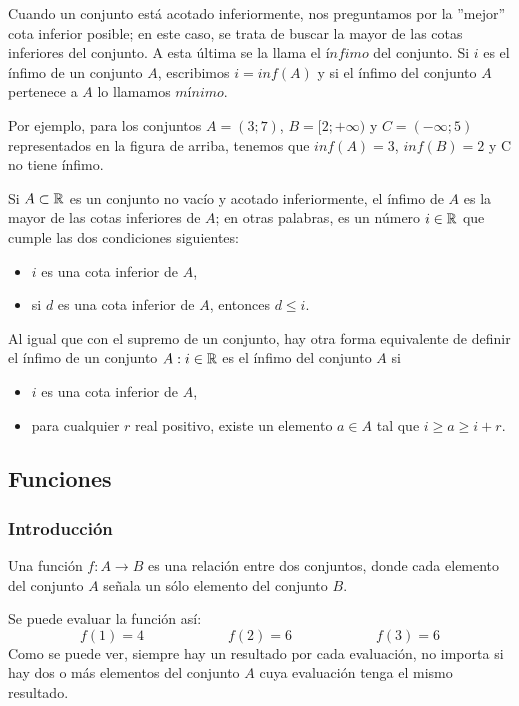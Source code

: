 \documentclass[../teoria.root.tex]{subfiles}
\begin{document}
Cuando un conjunto está acotado inferiormente, nos preguntamos por la ”mejor” cota inferior posible; en este caso, se trata de buscar la mayor de las cotas inferiores del conjunto.
A esta última se la llama el \(\textit{ínfimo}\) del conjunto.
Si \(i\) es el ínfimo de un conjunto \(A\), escribimos \(i = inf(A)\) y si el ínfimo del conjunto \(A\) pertenece a \(A\) lo llamamos \(\textit{mínimo}\).

Por ejemplo, para los conjuntos \(A = (3; 7)\), \(B = [2; +\infty)\) y \(C = (−\infty; 5)\) representados en la figura de arriba, tenemos que \(inf(A) = 3\), \(inf(B) = 2\) y C no tiene ínfimo.

Si \(A \subset \mathbb{R}\) es un conjunto no vacío y acotado inferiormente, el ínfimo de \(A\) es la mayor de las cotas inferiores de \(A\); en otras palabras, es un número \(i \in \mathbb{R}\) que cumple las dos condiciones siguientes:
\begin{itemize}
    \item \(i\) es una cota inferior de \(A\),
    \item si \(d\) es una cota inferior de \(A\), entonces \(d \leq i\).
\end{itemize}
Al igual que con el supremo de un conjunto, hay otra forma equivalente de definir el ínfimo de un conjunto \(A: i \in \mathbb{R}\) es el ínfimo del conjunto \(A\) si
\begin{itemize}
    \item \(i\) es una cota inferior de \(A\),
    \item para cualquier \(r\) real positivo, existe un elemento \(a \in A\) tal que \(i \geq a \geq i + r\).
\end{itemize}
\subsection{Funciones}
\subsubsection{Introducción}
Una función \(f: A \rightarrow B\) es una relación entre dos conjuntos, donde cada elemento del conjunto \(A\) señala un sólo elemento del conjunto \(B\).
\begin{center}
\end{center}
Se puede evaluar la función así:
\[f(1) = 4 \qquad\qquad\qquad f(2) = 6 \qquad\qquad\qquad f(3) = 6\]
Como se puede ver, siempre hay un resultado por cada evaluación, no importa si hay dos o más elementos del conjunto \(A\) cuya evaluación tenga el mismo resultado.
\end{document}
